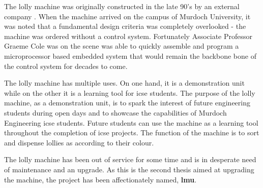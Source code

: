 The lolly machine was originally constructed in the late 90's by an external company \cite{computerControlGCole}. When the machine arrived on the campus of Murdoch University, it was noted that a fundamental design criteria was completely overlooked - the machine was ordered without a control system. Fortunately Associate Professor Graeme Cole was on the scene was able to quickly assemble and program a microprocessor based embedded system that would remain the backbone bone of the control system for decades to come. 

The lolly machine has multiple uses. On one hand, it is a demonstration unit while on the other it is a learning tool for \acrshort{icse} students. The purpose of the lolly machine, as a demonstration unit, is to spark the interest of future engineering students during open days and to showcase the capabilities of Murdoch Engineering \acrlong{icse} students. Future students can use the machine as a learning tool throughout the completion of \acrshort{icse} projects. 
The function of the machine is to sort and dispense lollies as according to their colour.

The lolly machine has been out of service for some time and is in desperate need of maintenance and an upgrade. As this is the second thesis aimed at upgrading the machine, the project has been affectionately named, \textbf{\acrfull{lmu}}.

